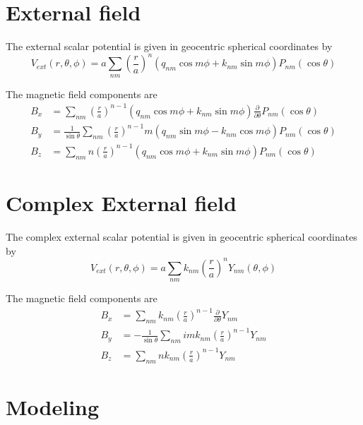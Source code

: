 \documentclass{article}
\begin{document}
\section{External field}

The external scalar potential is given in geocentric spherical coordinates by
\begin{equation}
V_{ext}(r,\theta,\phi) = a \sum_{nm} \left( \frac{r}{a} \right)^n \left( q_{nm} \cos{m \phi} + k_{nm} \sin{m \phi} \right)
P_{nm}(\cos{\theta})
\end{equation}

The magnetic field components are
\begin{align}
B_x &= \sum_{nm} \left( \frac{r}{a} \right)^{n-1} \left( q_{nm} \cos{m \phi} + k_{nm} \sin{m \phi} \right)
\frac{\partial}{\partial \theta} P_{nm}(\cos{\theta}) \\
B_y &= \frac{1}{\sin{\theta}} \sum_{nm} \left( \frac{r}{a} \right)^{n-1} m
\left( q_{nm} \sin{m \phi} - k_{nm} \cos{m \phi} \right) P_{nm}(\cos{\theta}) \\
B_z &= \sum_{nm} n \left( \frac{r}{a} \right)^{n-1} \left( q_{nm} \cos{m \phi} + k_{nm} \sin{m \phi} \right)
P_{nm}(\cos{\theta})
\end{align}

\section{Complex External field}

The complex external scalar potential is given in geocentric spherical coordinates by
\begin{equation}
V_{ext}(r,\theta,\phi) = a \sum_{nm} k_{nm} \left( \frac{r}{a} \right)^n Y_{nm}(\theta,\phi)
\end{equation}

The magnetic field components are
\begin{align}
B_x &= \sum_{nm} k_{nm} \left( \frac{r}{a} \right)^{n-1} \frac{\partial}{\partial \theta} Y_{nm} \\
B_y &= -\frac{1}{\sin{\theta}} \sum_{nm} im k_{nm} \left( \frac{r}{a} \right)^{n-1} Y_{nm} \\
B_z &= \sum_{nm} n k_{nm} \left( \frac{r}{a} \right)^{n-1} Y_{nm}
\end{align}

\section{Modeling}
\end{document}
